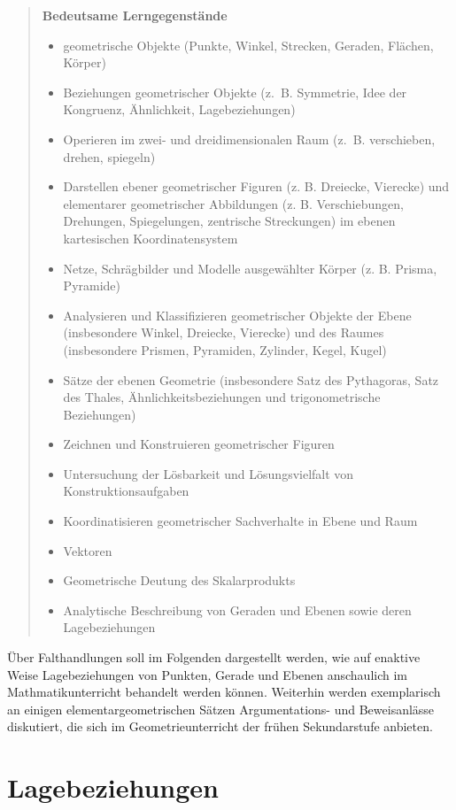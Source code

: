 \documentclass[
]{scrbook}
\providecommand{\tightlist}{%
  \setlength{\itemsep}{0pt}\setlength{\parskip}{0pt}}
\theoremstyle{definition}
\theoremstyle{definition}
\theoremstyle{definition}
\theoremstyle{definition}
\theoremstyle{remark}
\begin{document}
\begin{quote}
\textbf{Bedeutsame Lerngegenstände}

\begin{itemize}
\tightlist
\item
  geometrische Objekte (Punkte, Winkel, Strecken, Geraden, Flächen, Körper)
\item
  Beziehungen geometrischer Objekte (z.~B. Symmetrie, Idee der Kongruenz, Ähnlichkeit, Lagebeziehungen)
\item
  Operieren im zwei- und dreidimensionalen Raum (z.~B. verschieben, drehen, spiegeln)
\item
  Darstellen ebener geometrischer Figuren (z. B. Dreiecke, Vierecke) und elementarer geometrischer Abbildungen (z. B. Verschiebungen, Drehungen, Spiegelungen, zentrische Streckungen) im ebenen kartesischen Koordinatensystem
\item
  Netze, Schrägbilder und Modelle ausgewählter Körper (z. B. Prisma, Pyramide)
\item
  Analysieren und Klassifizieren geometrischer Objekte der Ebene (insbesondere Winkel, Dreiecke, Vierecke) und des Raumes (insbesondere Prismen, Pyramiden, Zylinder, Kegel, Kugel)
\item
  Sätze der ebenen Geometrie (insbesondere Satz des Pythagoras, Satz des Thales, Ähnlichkeitsbeziehungen und trigonometrische Beziehungen)
\item
  Zeichnen und Konstruieren geometrischer Figuren
\item
  Untersuchung der Lösbarkeit und Lösungsvielfalt von Konstruktionsaufgaben
\item
  Koordinatisieren geometrischer Sachverhalte in Ebene und Raum
\item
  Vektoren
\item
  Geometrische Deutung des Skalarprodukts
\item
  Analytische Beschreibung von Geraden und Ebenen sowie deren Lagebeziehungen
\end{itemize}
\end{quote}

Über Falthandlungen soll im Folgenden dargestellt werden, wie auf enaktive Weise Lagebeziehungen von Punkten, Gerade und Ebenen anschaulich im Mathmatikunterricht behandelt werden können. Weiterhin werden exemplarisch an einigen elementargeometrischen Sätzen Argumentations- und Beweisanlässe diskutiert, die sich im Geometrieunterricht der frühen Sekundarstufe anbieten.

\hypertarget{lagebeziehungen}{%
\section{Lagebeziehungen}\label{lagebeziehungen}}
\end{document}
